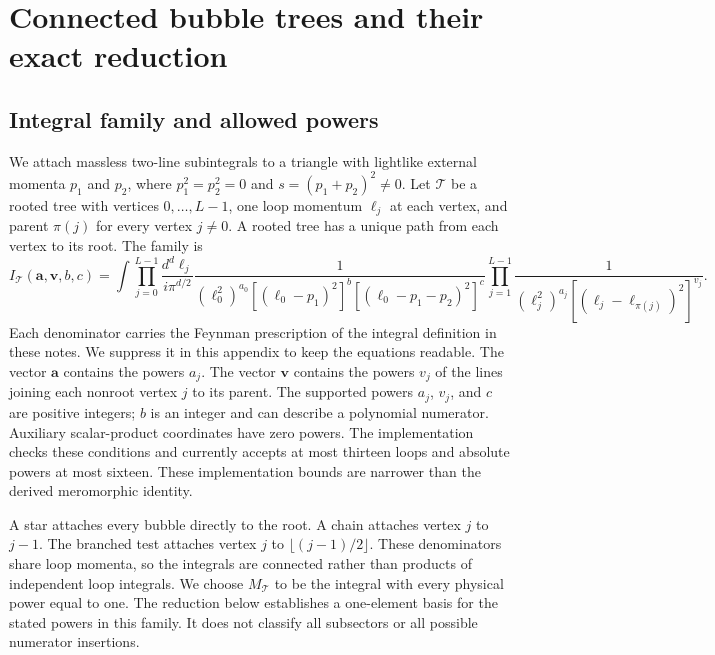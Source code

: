 \section{Connected bubble trees and their exact reduction}
\label{app:notes-loop-tree}
\subsection{Integral family and allowed powers}
We attach massless two-line subintegrals to a triangle with lightlike external momenta $p_1$ and $p_2$, where $p_1^2=p_2^2=0$ and $s=(p_1+p_2)^2\ne0$. Let $\mathcal T$ be a rooted tree with vertices $0,\ldots,L-1$, one loop momentum $\ell_j$ at each vertex, and parent $\pi(j)$ for every vertex $j\ne0$. A rooted tree has a unique path from each vertex to its root. The family is
\begin{equation}
 I_{\mathcal T}(\boldsymbol a,\boldsymbol v,b,c)=
 \int\prod_{j=0}^{L-1}\frac{d^d\ell_j}{i\pi^{d/2}}
 \frac{1}{(\ell_0^2)^{a_0}[(\ell_0-p_1)^2]^b
 [ (\ell_0-p_1-p_2)^2]^c}
 \prod_{j=1}^{L-1}
 \frac{1}{(\ell_j^2)^{a_j}[(\ell_j-\ell_{\pi(j)})^2]^{v_j}}.
 \label{eq:notes-loop-tree-family}
\end{equation}
Each denominator carries the Feynman prescription of the integral definition in these notes. We suppress it in this appendix to keep the equations readable. The vector $\boldsymbol a$ contains the powers $a_j$. The vector $\boldsymbol v$ contains the powers $v_j$ of the lines joining each nonroot vertex $j$ to its parent. The supported powers $a_j$, $v_j$, and $c$ are positive integers; $b$ is an integer and can describe a polynomial numerator. Auxiliary scalar-product coordinates have zero powers. The implementation checks these conditions and currently accepts at most thirteen loops and absolute powers at most sixteen. These implementation bounds are narrower than the derived meromorphic identity.

A star attaches every bubble directly to the root. A chain attaches vertex $j$ to $j-1$. The branched test attaches vertex $j$ to $\lfloor(j-1)/2\rfloor$. These denominators share loop momenta, so the integrals are connected rather than products of independent loop integrals. We choose $M_{\mathcal T}$ to be the integral with every physical power equal to one. The reduction below establishes a one-element basis for the stated powers in this family. It does not classify all subsectors or all possible numerator insertions.

